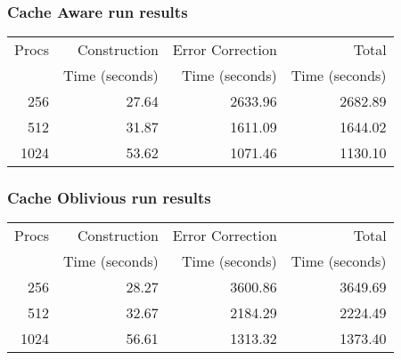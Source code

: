 \documentclass[integrals, nointegrals, article, 12pt, a4paper]{article}
\begin{document}
\subsubsection{Cache Aware run results}
\label{sec-2-5-2}

\begin{center}
\begin{tabular}{rrrr}
\hline
Procs & Construction & Error Correction & Total\\
 & Time (seconds) & Time (seconds) & Time (seconds)\\
\hline
256 & 27.64 & 2633.96 & 2682.89\\
512 & 31.87 & 1611.09 & 1644.02\\
1024 & 53.62 & 1071.46 & 1130.10\\
\hline
\end{tabular}
\end{center}
\subsubsection{Cache Oblivious run results}
\label{sec-2-5-3}

\begin{center}
\begin{tabular}{rrrr}
\hline
Procs & Construction & Error Correction & Total\\
 & Time (seconds) & Time (seconds) & Time (seconds)\\
\hline
256 & 28.27 & 3600.86 & 3649.69\\
512 & 32.67 & 2184.29 & 2224.49\\
1024 & 56.61 & 1313.32 & 1373.40\\
\hline
\end{tabular}
\end{center}
\end{document}
